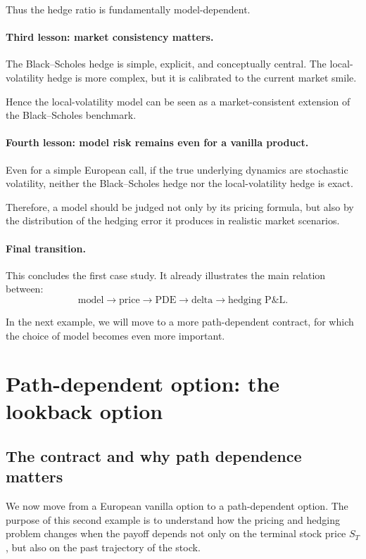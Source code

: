 \documentclass[11pt]{article}
\theoremstyle{plain}
\theoremstyle{definition}
\theoremstyle{remark}
\begin{document}
Thus the hedge ratio is fundamentally model-dependent.

\paragraph{Third lesson: market consistency matters.}
The Black--Scholes hedge is simple, explicit, and conceptually central.
The local-volatility hedge is more complex, but it is calibrated to the
current market smile.

Hence the local-volatility model can be seen as a market-consistent
extension of the Black--Scholes benchmark.

\paragraph{Fourth lesson: model risk remains even for a vanilla product.}
Even for a simple European call, if the true underlying dynamics are
stochastic volatility, neither the Black--Scholes hedge nor the
local-volatility hedge is exact.

Therefore, a model should be judged not only by its pricing formula, but
also by the distribution of the hedging error it produces in realistic
market scenarios.

\paragraph{Final transition.}
This concludes the first case study.
It already illustrates the main relation between:
\[
\text{model}
\longrightarrow
\text{price}
\longrightarrow
\text{PDE}
\longrightarrow
\text{delta}
\longrightarrow
\text{hedging P\&L}.
\]

In the next example, we will move to a more path-dependent contract, for
which the choice of model becomes even more important.

\section{Path-dependent option: the lookback option}

\subsection{The contract and why path dependence matters}

We now move from a European vanilla option to a path-dependent option.
The purpose of this second example is to understand how the pricing and
hedging problem changes when the payoff depends not only on the terminal
stock price \(S_T\), but also on the past trajectory of the stock.
\end{document}
